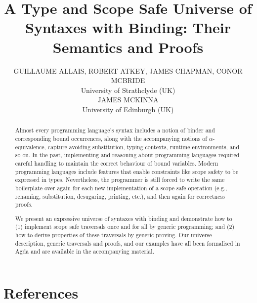 \documentclass{jfp1}
\title
  [A Type and Scope Safe Universe of Syntaxes with Binding]
  {A Type and Scope Safe Universe of Syntaxes with Binding: Their Semantics and Proofs}
\author[G. Allais et al.]
 { GUILLAUME ALLAIS,
   ROBERT ATKEY,
   JAMES CHAPMAN,
   CONOR MCBRIDE\\
   University of Strathclyde (UK)\\
   JAMES MCKINNA\\
   University of Edinburgh (UK)
  }
\begin{document}
\maketitle
\begin{abstract}
Almost every programming language's syntax includes a notion of binder
and corresponding bound occurrences, along with the accompanying
notions of $\alpha$-equivalence, capture avoiding substitution, typing
contexts, runtime environments, and so on. In the past, implementing
and reasoning about programming languages required careful handling to
maintain the correct behaviour of bound variables. Modern programming
languages include features that enable constraints like scope safety
to be expressed in types. Nevertheless, the programmer is still forced
to write the same boilerplate over again for each new implementation
of a scope safe operation (e.g., renaming, substitution, desugaring,
printing, etc.), and then again for correctness proofs.

We present an expressive universe of syntaxes with binding and
demonstrate how to (1) implement scope safe traversals once and for
all by generic programming; and (2) how to derive properties of these
traversals by generic proving. Our universe description, generic
traversals and proofs, and our examples have all been formalised in
Agda and are available in the accompanying material.
\end{abstract}




\renewcommand{\bibsection}{}
\section*{References}


\end{document}
